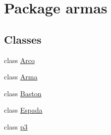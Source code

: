 \hypertarget{namespacearmas}{}\section{Package armas}
\label{namespacearmas}
\subsection*{Classes}
\begin{DoxyCompactItemize}
\item 
class \mbox{\hyperlink{classarmas_1_1_arco}{Arco}}
\item 
class \mbox{\hyperlink{classarmas_1_1_arma}{Arma}}
\item 
class \mbox{\hyperlink{classarmas_1_1_baston}{Baston}}
\item 
class \mbox{\hyperlink{classarmas_1_1_espada}{Espada}}
\item 
class \mbox{\hyperlink{classarmas_1_1p3}{p3}}
\end{DoxyCompactItemize}
